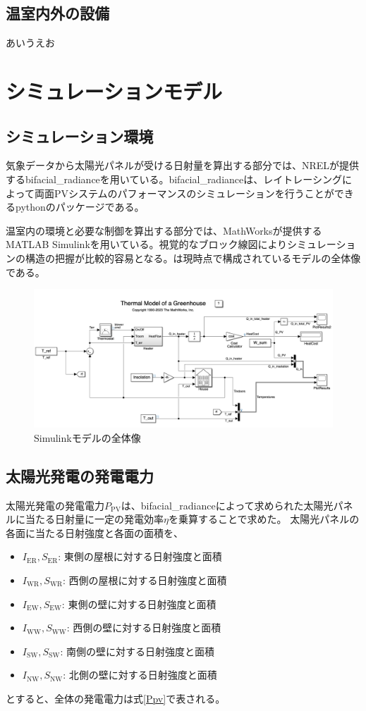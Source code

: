 \documentclass[uplatex,dvipdfmx,nomag,a4paper,oneside,onecolumn,12pt]{bxjsreport} %
\begin{document}
\subsection{温室内外の設備}
あいうえお

\section{シミュレーションモデル}
\subsection{シミュレーション環境}
気象データから太陽光パネルが受ける日射量を算出する部分では、NRELが提供するbifacial\_radianceを用いている。bifacial\_radianceは、レイトレーシングによって両面PVシステムのパフォーマンスのシミュレーションを行うことができるpythonのパッケージである\cite{Bifacialradiance}。

温室内の環境と必要な制御を算出する部分では、MathWorksが提供するMATLAB Simulinkを用いている\cite{MATLAB}。視覚的なブロック線図によりシミュレーションの構造の把握が比較的容易となる。は現時点で構成されているモデルの全体像である。

\begin{figure}[ht]
    \centering
    \includegraphics[width=0.9\linewidth]{fig/Simulink.png}
    \caption{Simulinkモデルの全体像}
    \label{fig:Simulink}
\end{figure}


\subsection{太陽光発電の発電電力}
太陽光発電の発電電力\(P_{\text{PV}}\)は、bifacial\_radianceによって求められた太陽光パネルに当たる日射量に一定の発電効率\(\eta\)を乗算することで求めた。
太陽光パネルの各面に当たる日射強度と各面の面積を、
\begin{itemize}
    \item \(I_{\text{ER}}, S_{\text{ER}}\): 東側の屋根に対する日射強度と面積
    \item \(I_{\text{WR}}, S_{\text{WR}}\): 西側の屋根に対する日射強度と面積
    \item \(I_{\text{EW}}, S_{\text{EW}}\): 東側の壁に対する日射強度と面積
    \item \(I_{\text{WW}}, S_{\text{WW}}\): 西側の壁に対する日射強度と面積
    \item \(I_{\text{SW}}, S_{\text{SW}}\): 南側の壁に対する日射強度と面積
    \item \(I_{\text{NW}}, S_{\text{NW}}\): 北側の壁に対する日射強度と面積
\end{itemize}
とすると、全体の発電電力は式\eqref{Ppv}で表される。
\end{document}
